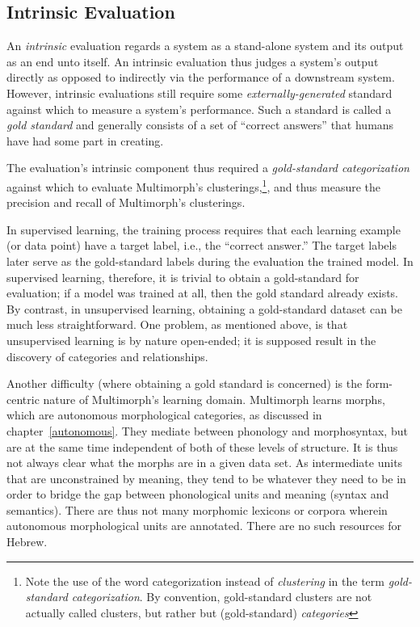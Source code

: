\subsection{Intrinsic Evaluation}
\label{sec:intrinsic}
An \emph{intrinsic} evaluation regards a system as a stand-alone system and its output as an end unto itself. An intrinsic evaluation thus judges a system's output directly as opposed to indirectly via the performance of a downstream system. However, intrinsic evaluations still require some \emph{externally-generated} standard against which to measure a system's performance. Such a standard is called a \emph{gold standard} and generally consists of a set of ``correct answers'' that humans have had some part in creating.

The evaluation's intrinsic component thus required a 
\emph{gold-standard categorization} against which to evaluate 
Multimorph's clusterings,\footnote{Note the use of the word {categorization} 
instead of \emph{clustering} in the term \emph{gold-standard categorization}. 
By convention, gold-standard clusters are not actually called clusters, but rather 
but (gold-standard) \emph{categories}}, and thus measure the precision 
and recall of Multimorph's clusterings. 

In supervised learning, the training process requires that each learning example 
(or data point) have a target label, i.e., the ``correct answer.'' The target labels 
later serve as the gold-standard labels during the evaluation the trained model. 
In supervised learning, therefore, it is trivial to obtain a gold-standard 
for evaluation; if a model was trained at all, then the gold standard 
already exists. By contrast, in unsupervised learning, obtaining a gold-standard 
dataset can be much less straightforward. One problem, as mentioned above, 
is that unsupervised learning is by nature open-ended; it is 
supposed result in the discovery of categories and relationships.  

Another difficulty (where obtaining a gold standard is concerned) is the 
form-centric nature of Multimorph's learning domain. Multimorph learns morphs, 
which are autonomous morphological categories, as discussed in chapter~\ref{autonomous}. 
They mediate between phonology and morphosyntax, but are at the same time independent 
of both of these levels of structure. It is thus not always clear what the morphs are in a 
given data set. As intermediate units that are unconstrained by meaning, they tend 
to be whatever they need to be in order to bridge the gap between phonological units 
and meaning (syntax and semantics).  There are thus not many morphomic lexicons 
or corpora wherein autonomous morphological units are annotated. There are no 
such resources for Hebrew.

